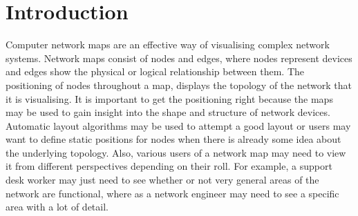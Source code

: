 \documentclass[11pt, a4paper]{article}
\begin{document}
\date{26/10/2011}

\tableofcontents

\newpage

\abs{
}

\section{Introduction}
\label{sec:introduction}


Computer network maps are an effective way of visualising complex network
systems. Network maps consist of nodes and edges, where nodes represent devices
and edges show the physical or logical relationship between them. The
positioning of nodes throughout a map, displays the topology of the network that
it is visualising. It is important to get the positioning right because the maps
may be used to gain insight into the shape and structure of network devices.
Automatic layout algorithms may be used to attempt a good layout or users may
want to define static positions for nodes when there is already some idea about
the underlying topology. Also, various users of a network map may need to view
it from different perspectives depending on their roll. For example, a support
desk worker may just need to see whether or not very general areas of the
network are functional, where as a network engineer may need to see a specific
area with a lot of detail.
\end{document}
